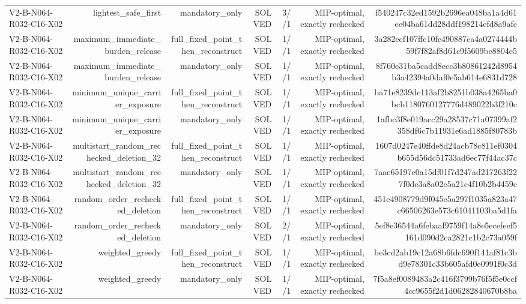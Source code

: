 {\begin{longtable}{lrrrrrr}
V2-B-N064-R032-C16-X02 & lightest\_safe\_first & mandatory\_only & SOLVED & 3//1 & MIP-optimal, exactly rechecked & f540247c32ed1592b2696ea048ba1a4d61ec04ba61dd28ddf198214efd8a9afc \\
V2-B-N064-R032-C16-X02 & maximum\_immediate\_burden\_release & full\_fixed\_point\_then\_reconstruct & SOLVED & 1//1 & MIP-optimal, exactly rechecked & 3a282ecf107ffc10fc490887ca4a0274444b59f7f82af8d61c9f5609be8804e5 \\
V2-B-N064-R032-C16-X02 & maximum\_immediate\_burden\_release & mandatory\_only & SOLVED & 1//1 & MIP-optimal, exactly rechecked & 8f760e31ba5cadd8ecc3b80861242d8954b3a42394a0daf0e5ab614e6831d728 \\
V2-B-N064-R032-C16-X02 & minimum\_unique\_carrier\_exposure & full\_fixed\_point\_then\_reconstruct & SOLVED & 1//1 & MIP-optimal, exactly rechecked & ba71e8239dc113af2b8251b038a4265ba0bcb1180760127776d489022b3f210c \\
V2-B-N064-R032-C16-X02 & minimum\_unique\_carrier\_exposure & mandatory\_only & SOLVED & 1//1 & MIP-optimal, exactly rechecked & 1afbc3f8e019acc29a28537c71a07399af2358df6c7b11931e6ad1885f80783b \\
V2-B-N064-R032-C16-X02 & multistart\_random\_rechecked\_deletion\_32 & full\_fixed\_point\_then\_reconstruct & SOLVED & 1//1 & MIP-optimal, exactly rechecked & 1607d0247e40ffde8d24acb78c811ef0304b655d56dc51733ad6ec77f44ac37c \\
V2-B-N064-R032-C16-X02 & multistart\_random\_rechecked\_deletion\_32 & mandatory\_only & SOLVED & 1//1 & MIP-optimal, exactly rechecked & 7aae65197c0a15df01f7d247ad217263f227f0dc3a8a02e5a21c4f10b2b4459c \\
V2-B-N064-R032-C16-X02 & random\_order\_rechecked\_deletion & full\_fixed\_point\_then\_reconstruct & SOLVED & 1//1 & MIP-optimal, exactly rechecked & 451e4908779d9f045e5a297f1035a823a47c66506263e573c61041103ba5d1fa \\
V2-B-N064-R032-C16-X02 & random\_order\_rechecked\_deletion & mandatory\_only & SOLVED & 2//1 & MIP-optimal, exactly rechecked & 5ef8e36544a6febaaf9759f14a8e5ecefeef5161d090d2ca2821c1b2c73a059f \\
V2-B-N064-R032-C16-X02 & weighted\_greedy & full\_fixed\_point\_then\_reconstruct & SOLVED & 1//1 & MIP-optimal, exactly rechecked & be3cd2ab19c12a68b6fdc690f141af81c3bd9e78301c33b605afd0e0991f0c3d \\
V2-B-N064-R032-C16-X02 & weighted\_greedy & mandatory\_only & SOLVED & 1//1 & MIP-optimal, exactly rechecked & 7f5a8ef0089483a2c416f3799b76f5f5e0ccf4cc9655f2d1d06282840670b8ba \\

\end{longtable}}
